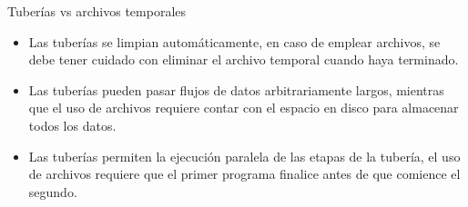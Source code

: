 \documentclass{libs/ufc_format}
\begin{document}
\begin{frame}{Tuberías vs archivos temporales}
  \begin{itemize}
    \item Las tuberías se limpian automáticamente, en caso de emplear archivos, se debe tener cuidado con eliminar el archivo temporal cuando haya terminado.
    \item Las tuberías pueden pasar flujos de datos arbitrariamente largos, mientras que el uso de archivos requiere contar con el espacio en disco para almacenar todos los datos.
    \item Las tuberías permiten la ejecución paralela de las etapas de la tubería, el uso de archivos requiere que el primer programa finalice antes de que comience el segundo.
  \end{itemize}
\end{frame}
\end{document}
